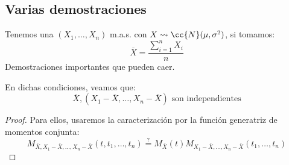 \subsection{Varias demostraciones}
Tenemos una $(X_1, \ldots, X_n)$ m.a.s. con $X\rightsquigarrow \cc{N}(\mu, \sigma^2)$, si tomamos:
\begin{equation*}
    \overline{X} = \dfrac{\sum_{i=1}^{n}X_i}{n}
\end{equation*}
Demostraciones importantes que pueden caer.

\begin{prop}
    En dichas condiciones, veamos que:
    \begin{equation*}
        \overline{X}, (X_1 - \overline{X}, \ldots, X_n - \overline{X}) \text{\ son independientes}
    \end{equation*}
    \begin{proof}
        Para ellos, usaremos la caracterización por la función generatriz de momentos conjunta:
        \begin{equation*}
            M_{\overline{X},X_1 - \overline{X}, \ldots, X_n - \overline{X}}(t,t_1, \ldots, t_n) \stackrel{\text{?}}{=} M_{\overline{X}}(t) M_{X_1 - \overline{X}, \ldots, X_n - \overline{X}}(t_1, \ldots, t_n)
        \end{equation*}


\end{proof}
\end{prop}
